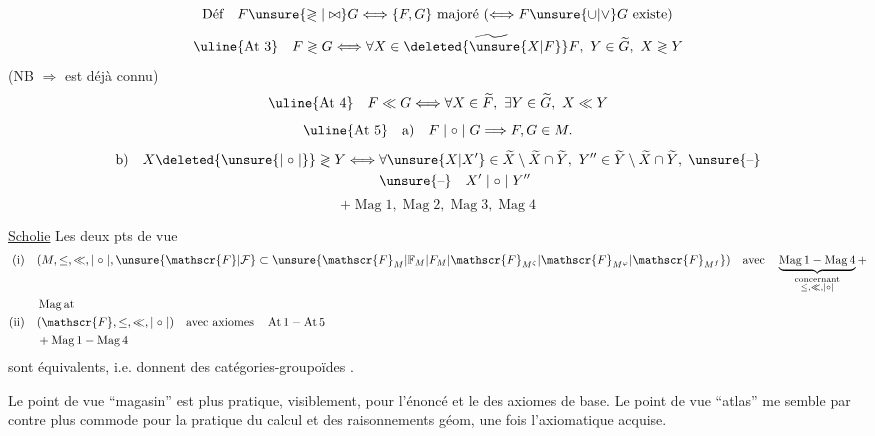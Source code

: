 \[
\text{Déf}\quad F\unsure{\gtrless|\bowtie}G\Longleftrightarrow\{F,G\}\text{ majoré }(\Longleftrightarrow F\unsure{\cup|\vee}G\text{ existe})
\]
\[
\text{\uline{At 3}}\quad F\gtrless G\Longleftrightarrow\forall X\in\widetilde{\deleted{\unsure{X|F}}F},\ Y\in\widetilde{G},\ X\gtrless Y
\]
(NB $\Rightarrow$ est déjà connu)
\[
\text{\uline{At 4}}\quad F\ll G\Longleftrightarrow\forall X\in\widetilde{F},\ \exists Y\in\widetilde{G},\ X\ll Y
\]
\[
\text{\uline{At 5}}\quad\text{a)}\quad F\mid\circ\mid G\Longrightarrow F,G\in M.
\]
\[
\begin{aligned}
\text{b)}\quad X\deleted{\unsure{\mid\circ\mid}}\gtrless Y\Longleftrightarrow{}&\forall\unsure{X|X'}\in\widetilde{X}\setminus\widetilde{X}\cap\widetilde{Y},\ Y''\in\widetilde{Y}\setminus\widetilde{X}\cap\widetilde{Y},\;\unsure{\text{--}}\\
&\unsure{\text{--}}\quad X'\mid\circ\mid Y''
\end{aligned}
\]
\[
+\operatorname{Mag}1,\operatorname{Mag}2,\operatorname{Mag}3,\operatorname{Mag}4
\]

\uline{Scholie} Les deux pts de vue
\[
\begin{aligned}
\text{(i)}\quad &(M,\leq,\ll,\mid\circ\mid,\unsure{\mathscr{F}|\mathcal{F}}\subset\unsure{\mathscr{F}_M|\mathbb{F}_M|F_M|\mathscr{F}_{M^{\zeta}}|\mathscr{F}_{M^{\varphi}}|\mathscr{F}_{M^f}})\quad\text{avec}\quad
\underbrace{\operatorname{Mag}1-\operatorname{Mag}4}_{\substack{\text{concernant}\\\leq,\ll,\mid\circ\mid}}+\\
&\operatorname{Mag\,at}\\
\text{(ii)}\quad &(\mathscr{F},\leq,\ll,\mid\circ\mid)\quad\text{avec axiomes}\quad\operatorname{At}1-\operatorname{At}5\\
&+\operatorname{Mag}1-\operatorname{Mag}4
\end{aligned}
\]
sont équivalents, i.e. donnent des catégories-groupoïdes .

Le point de vue ``magasin'' est plus pratique, visiblement, pour l'énoncé et le  des axiomes de base.
Le point de vue ``atlas'' me semble par contre plus commode pour la pratique du calcul et des raisonnements géom, une fois l'axiomatique acquise.
